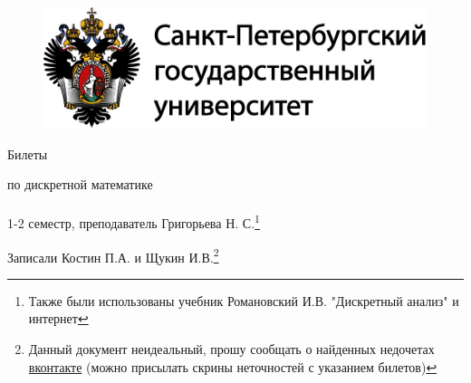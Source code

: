 \documentclass[main]{subfiles}
\begin{document}
	\begin{figure}[H]
			\includegraphics[width=12cm]{../../template/spsu.jpg}
			\centering
	\end{figure}
	\vspace*{\fill}
	\begin{center}
		\huge Билеты

		\huge по дискретной математике\\ \ \\
		\Large 1-2 семестр, преподаватель Григорьева Н. С.\footnote{Также были использованы учебник Романовский И.В. "Дискретный анализ"{} и интернет}

		\large Записали Костин П.А. и Щукин И.В.\footnote{Данный документ неидеальный, прошу сообщать о найденных недочетах \href{https://vk.com/drab_existence_a}{вконтакте} (можно присылать скрины неточностей с указанием билетов)}
	\end{center}
	\vspace*{\fill}
	\vspace*{\fill}

	\newpage
	\tableofcontents
	\newpage
\end{document}
